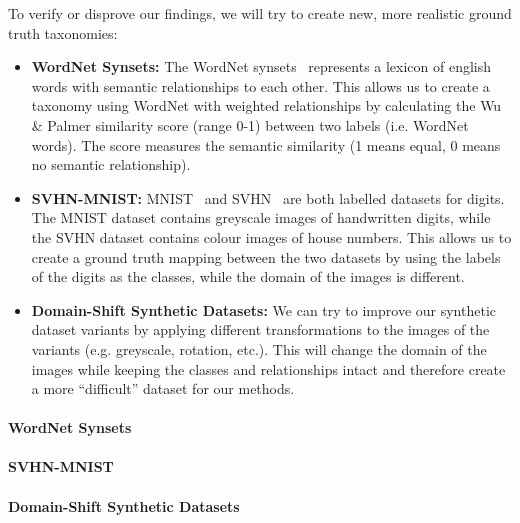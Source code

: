 To verify or disprove our findings, we will try to create new, more realistic ground truth taxonomies:
\begin{itemize}
      \item \textbf{WordNet Synsets:} The WordNet synsets~\cite{fellbaum_wordnet_1998,noauthor_wordnet_nodate}
            represents a lexicon of english words with semantic relationships to each other.
            This allows us to create a taxonomy using WordNet with weighted relationships by calculating
            the Wu \& Palmer similarity score (range 0-1) between two labels (i.e. WordNet words).
            The score measures the semantic similarity (1 means equal, 0 means no semantic relationship).
      \item \textbf{SVHN-MNIST:} MNIST~\cite{deng_mnist_2012} and SVHN~\cite{netzer_reading_2011} are both labelled datasets
            for digits. The MNIST dataset contains greyscale images of handwritten digits,
            while the SVHN dataset contains colour images of house numbers.
            This allows us to create a ground truth mapping between the two datasets
            by using the labels of the digits as the classes, while the domain of the images
            is different.
      \item \textbf{Domain-Shift Synthetic Datasets:} We can try to improve our synthetic dataset variants
            by applying different transformations to the images of the variants (e.g. greyscale, rotation, etc.).
            This will change the domain of the images while keeping the classes and relationships intact
            and therefore create a more \enquote{difficult} dataset for our methods.
\end{itemize}

\paragraph{WordNet Synsets}


\paragraph{SVHN-MNIST}


\paragraph{Domain-Shift Synthetic Datasets}


